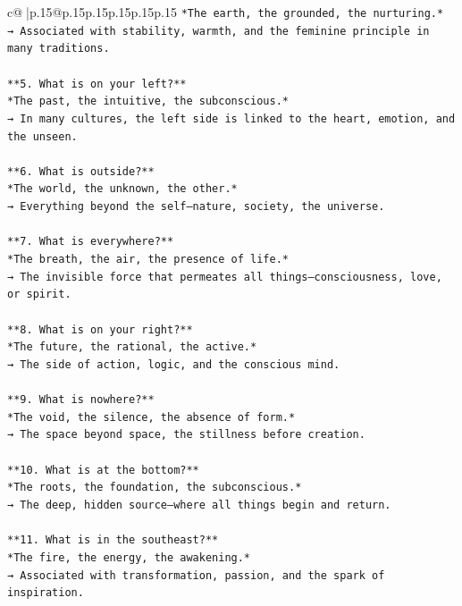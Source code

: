 \documentclass{article}
\begin{document}
{\begin{supertabular}{c@{$\;$}|p{.15\linewidth}@{}p{.15\linewidth}p{.15\linewidth}p{.15\linewidth}p{.15\linewidth}p{.15\linewidth}}
{{{\texttt{*The earth, the grounded, the nurturing.*  } \\
\texttt{→ Associated with stability, warmth, and the feminine principle in many traditions.} \\
\\ 
\texttt{**5. What is on your left?**  } \\
\texttt{*The past, the intuitive, the subconscious.*  } \\
\texttt{→ In many cultures, the left side is linked to the heart, emotion, and the unseen.} \\
\\ 
\texttt{**6. What is outside?**  } \\
\texttt{*The world, the unknown, the other.*  } \\
\texttt{→ Everything beyond the self—nature, society, the universe.} \\
\\ 
\texttt{**7. What is everywhere?**  } \\
\texttt{*The breath, the air, the presence of life.*  } \\
\texttt{→ The invisible force that permeates all things—consciousness, love, or spirit.} \\
\\ 
\texttt{**8. What is on your right?**  } \\
\texttt{*The future, the rational, the active.*  } \\
\texttt{→ The side of action, logic, and the conscious mind.} \\
\\ 
\texttt{**9. What is nowhere?**  } \\
\texttt{*The void, the silence, the absence of form.*  } \\
\texttt{→ The space beyond space, the stillness before creation.} \\
\\ 
\texttt{**10. What is at the bottom?**  } \\
\texttt{*The roots, the foundation, the subconscious.*  } \\
\texttt{→ The deep, hidden source—where all things begin and return.} \\
\\ 
\texttt{**11. What is in the southeast?**  } \\
\texttt{*The fire, the energy, the awakening.*  } \\
\texttt{→ Associated with transformation, passion, and the spark of inspiration.} \\
}}}
\end{supertabular}}
\end{document}
